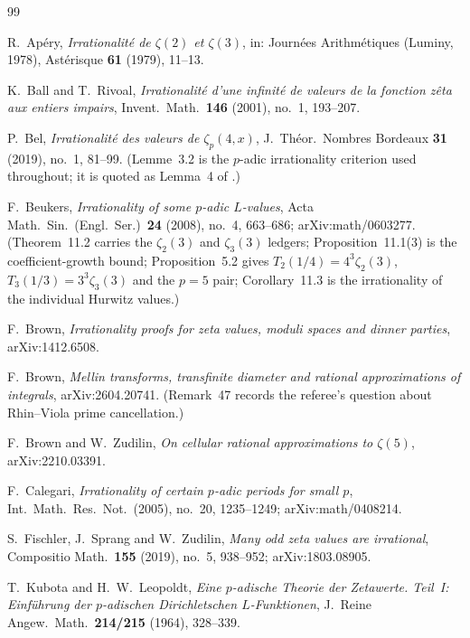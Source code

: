 \begin{thebibliography}{99}

R.~Ap\'ery,
\emph{Irrationalit\'e de $\zeta(2)$ et $\zeta(3)$},
in: Journ\'ees Arithm\'etiques (Luminy, 1978),
Ast\'erisque \textbf{61} (1979), 11--13.

K.~Ball and T.~Rivoal,
\emph{Irrationalit\'e d'une infinit\'e de valeurs de la fonction z\^eta aux
entiers impairs},
Invent.\ Math.\ \textbf{146} (2001), no.~1, 193--207.

P.~Bel,
\emph{Irrationalit\'e des valeurs de $\zeta_p(4,x)$},
J.\ Th\'eor.\ Nombres Bordeaux \textbf{31} (2019), no.~1, 81--99.
(Lemme~3.2 is the $p$-adic irrationality criterion used throughout; it is quoted
as Lemma~4 of \cite{LSZ2025}.)

F.~Beukers,
\emph{Irrationality of some $p$-adic $L$-values},
Acta Math.\ Sin.\ (Engl.\ Ser.)\ \textbf{24} (2008), no.~4, 663--686;
arXiv:math/0603277.
(Theorem~11.2 carries the $\zeta_2(3)$ and $\zeta_3(3)$ ledgers;
Proposition~11.1(3) is the coefficient-growth bound; Proposition~5.2 gives
$T_2(1/4)=4^3\zeta_2(3)$, $T_3(1/3)=3^3\zeta_3(3)$ and the $p=5$ pair;
Corollary~11.3 is the irrationality of the individual Hurwitz values.)

F.~Brown,
\emph{Irrationality proofs for zeta values, moduli spaces and dinner parties},
arXiv:1412.6508.

F.~Brown,
\emph{Mellin transforms, transfinite diameter and rational approximations of
integrals},
arXiv:2604.20741.
(Remark~47 records the referee's question about Rhin--Viola prime cancellation.)

F.~Brown and W.~Zudilin,
\emph{On cellular rational approximations to $\zeta(5)$},
arXiv:2210.03391.

F.~Calegari,
\emph{Irrationality of certain $p$-adic periods for small $p$},
Int.\ Math.\ Res.\ Not.\ (2005), no.~20, 1235--1249;
arXiv:math/0408214.

S.~Fischler, J.~Sprang and W.~Zudilin,
\emph{Many odd zeta values are irrational},
Compositio Math.\ \textbf{155} (2019), no.~5, 938--952; arXiv:1803.08905.

T.~Kubota and H.~W.~Leopoldt,
\emph{Eine $p$-adische Theorie der Zetawerte. Teil~I: Einf\"uhrung der
$p$-adischen Dirichletschen $L$-Funktionen},
J.\ Reine Angew.\ Math.\ \textbf{214/215} (1964), 328--339.


\end{thebibliography}
